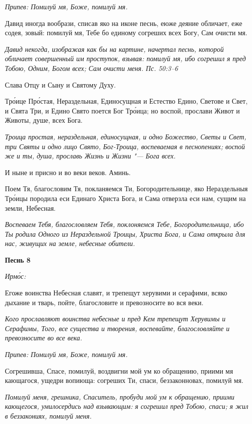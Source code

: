 \itshape Припев:\normalfont{} Помилуй мя, Боже, помилуй мя.


Давид иногда вообрази, списав яко на иконе песнь, еюже деяние обличает, еже содея, зовый: помилуй мя, Тебе бо единому согреших всех Богу, Сам очисти мя.


\itshape Давид некогда, изображая как бы на картине, начертал песнь, которой обличает совершенный им проступок, взывая: помилуй мя, ибо согрешил я пред Тобою, Одним, Богом всех; Сам очисти меня. Пс. 50:3–6\normalfont{}


Слава Отцу и Сыну и Святому Духу.


Тро́ице Про́стая, Нераздельная, Единосущная и Естество Едино, Светове и Свет, и Свята Три, и Едино Свято поется Бог Тро́ица; но воспой, прослави Живот и Животы, душе, всех Бога.


\itshape Троица простая, нераздельная, единосущная, и одно Божество, Светы и Свет, три Святы и одно лицо Свято, Бог-Троица, воспеваемая в песнопениях; воспой же и ты, душа, прославь Жизнь и Жизни "--- Бога всех.\normalfont{}


И ныне и присно и во веки веков. Аминь.


Поем Тя, благословим Тя, покланяемся Ти, Богородительнице, яко Нераздельныя Тро́ицы породила еси Единаго Христа Бога, и Сама отверзла еси нам, сущим на земли, Небесная.


\itshape Воспеваем Тебя, благословляем Тебя, поклоняемся Тебе, Богородительница, ибо Ты родила Одного из Нераздельной Троицы, Христа Бога, и Сама открыла для нас, живущих на земле, небесные обители.\normalfont{}





\bfseries Песнь 8\normalfont{}


\itshape Ирмо́с:\normalfont{}


Егоже воинства Небесная славят, и трепещут херувими и серафими, всяко дыхание и тварь, пойте, благословите и превозносите во вся веки.


\itshape Кого прославляют воинства небесные и пред Кем трепещут Херувимы и Серафимы, Того, все существа и творения, воспевайте, благословляйте и превозносите во все века.\normalfont{}


\itshape Припев:\normalfont{} Помилуй мя, Боже, помилуй мя.


Согрешивша, Спасе, помилуй, воздвигни мой ум ко обращению, приими мя кающагося, ущедри вопиюща: согреших Ти, спаси, беззаконновах, помилуй мя.


\itshape Помилуй меня, грешника, Спаситель, пробуди мой ум к обращению, приими кающегося, умилосердись над взывающим: я согрешил пред Тобою, спаси; я жил в беззакониях, помилуй меня.\normalfont{}


